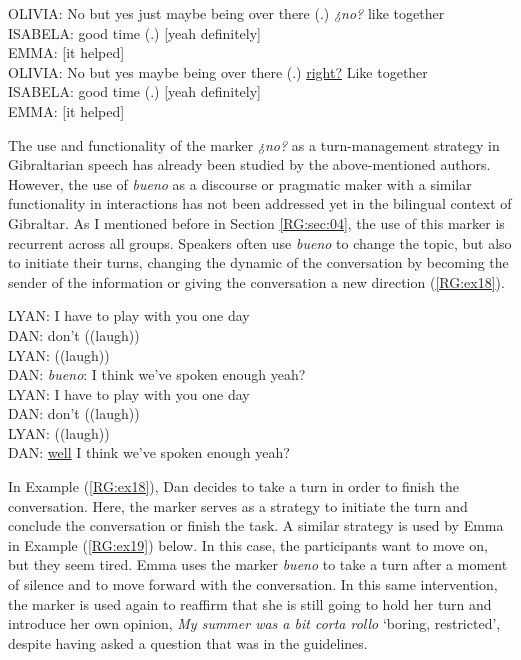 \documentclass[output=paper]{langscibook}
\begin{document}
\begin{exe}\ex\label{RG:ex17}
OLIVIA: No but yes just maybe being over there (.) \textit{¿no?} like together\\
ISABELA: good time (.) [yeah definitely]\\
EMMA: [it helped]\\

OLIVIA: No but yes maybe being over there (.) \ul{right?} Like together\\
ISABELA: good time (.) [yeah definitely]\\
EMMA: [it helped]
\end{exe}

The use and functionality of the marker \textit{¿no?} as a turn-management strategy in Gibraltarian speech has already been studied by the above-mentioned authors. However, the use of \textit{bueno} as a discourse or pragmatic maker with a similar functionality in interactions has not been addressed yet in the bilingual context of Gibraltar. As I mentioned before in Section \ref{RG:sec:04}, the use of this marker is recurrent across all groups. Speakers often use \textit{bueno} to change the topic, but also to initiate their turns, changing the dynamic of the conversation by becoming the sender of the information or giving the conversation a new direction (\ref{RG:ex18}). 

\begin{exe}\ex\label{RG:ex18}
LYAN:  I have to play with you one day\\
DAN: don’t ((laugh))\\
LYAN: ((laugh))\\
DAN: \textit{bueno}: I think we’ve spoken enough yeah?\\

LYAN: I have to play with you one day\\
DAN: don’t ((laugh))\\
LYAN: ((laugh))\\
DAN: \ul{well} I think we’ve spoken enough yeah?
\end{exe}

In Example (\ref{RG:ex18}), Dan decides to take a turn in order to finish the conversation. Here, the marker serves as a strategy to initiate the turn and conclude the conversation or finish the task. A similar strategy is used by Emma in Example (\ref{RG:ex19}) below. In this case, the participants want to move on, but they seem tired. Emma uses the marker \textit{bueno} to take a turn after a moment of silence and to move forward with the conversation. In this same intervention, the marker is used again to reaffirm that she is still going to hold her turn and introduce her own opinion, \textit{My summer was a bit corta rollo} ‘boring, restricted’, despite having asked a question that was in the guidelines.
\end{document}
